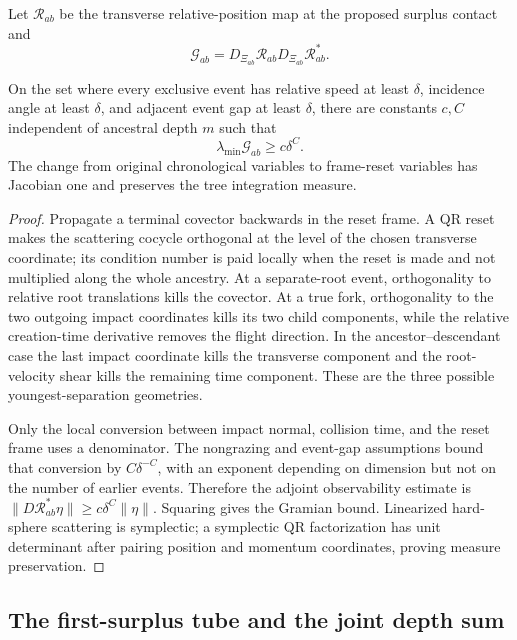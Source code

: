 Let $\mathcal R_{ab}$ be the transverse relative-position map at the proposed
surplus contact and
\[
 \mathcal G_{ab}=D_{\Xi_{ab}}\mathcal R_{ab}
                 D_{\Xi_{ab}}\mathcal R_{ab}^{*}.
\]

\begin{theorem}
\label{thm:r7-b2-frame}
On the set where every exclusive event has relative speed at least $\delta$,
incidence angle at least $\delta$, and adjacent event gap at least $\delta$,
there are constants $c,C$ independent of ancestral depth $m$ such that
\[
 \lambda_{\min}\mathcal G_{ab}\ge c\delta^C.
\]
The change from original chronological variables to frame-reset variables has
Jacobian one and preserves the tree integration measure.
\end{theorem}

\begin{proof}
Propagate a terminal covector backwards in the reset frame.  A QR reset makes
the scattering cocycle orthogonal at the level of the chosen transverse
coordinate; its condition number is paid locally when the reset is made and
not multiplied along the whole ancestry.  At a separate-root event,
orthogonality to relative root translations kills the covector.  At a true
fork, orthogonality to the two outgoing impact coordinates kills its two child
components, while the relative creation-time derivative removes the flight
direction.  In the ancestor--descendant case the last impact coordinate kills
the transverse component and the root-velocity shear kills the remaining time
component.  These are the three possible youngest-separation geometries.

Only the local conversion between impact normal, collision time, and the reset
frame uses a denominator.  The nongrazing and event-gap assumptions bound that
conversion by $C\delta^{-C}$, with an exponent depending on dimension but not
on the number of earlier events.  Therefore the adjoint observability estimate
is $\|D\mathcal R_{ab}^{*}\eta\|\ge c\delta^C\|\eta\|$.  Squaring gives the
Gramian bound.  Linearized hard-sphere scattering is symplectic; a symplectic
QR factorization has unit determinant after pairing position and momentum
coordinates, proving measure preservation.
\end{proof}

\subsection{The first-surplus tube and the joint depth sum}

